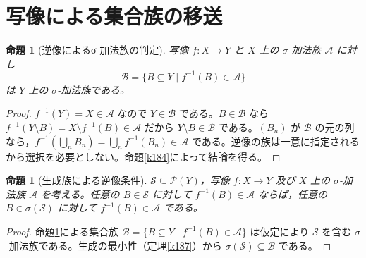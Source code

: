 \documentclass[a5paper,10pt,dvipdfmx]{jsarticle}
\theoremstyle{definition}
\theoremstyle{plain}
\newtheorem{prop}[ruledef]{命題}
\newcommand{\Pow}{\mathcal{P}}
\begin{document}
\section{写像による集合族の移送}
\begin{prop}[逆像によるσ-加法族の判定]\label{k191}
写像 $f\colon X\to Y$ と $X$ 上の $\sigma$-加法族 $\mathcal A$ に対し
\[\mathcal B=\{B\subseteq Y\mid f^{-1}(B)\in\mathcal A\}\]
は $Y$ 上の $\sigma$-加法族である。
\end{prop}
\begin{proof}
$f^{-1}(Y)=X\in\mathcal A$ なので $Y\in\mathcal B$ である。$B\in\mathcal B$ なら $f^{-1}(Y\setminus B)=X\setminus f^{-1}(B)\in\mathcal A$ だから $Y\setminus B\in\mathcal B$ である。$(B_n)$ が $\mathcal B$ の元の列なら，$f^{-1}(\bigcup_n B_n)=\bigcup_n f^{-1}(B_n)\in\mathcal A$ である。逆像の族は一意に指定されるから選択を必要としない。命題\ref{k184}によって結論を得る。
\end{proof}
\begin{prop}[生成族による逆像条件]\label{k192}
$\mathcal S\subseteq\Pow(Y)$，写像 $f\colon X\to Y$ 及び $X$ 上の $\sigma$-加法族 $\mathcal A$ を考える。任意の $B\in\mathcal S$ に対して $f^{-1}(B)\in\mathcal A$ ならば，任意の $B\in\sigma(\mathcal S)$ に対して $f^{-1}(B)\in\mathcal A$ である。
\end{prop}
\begin{proof}
命題\ref{k191}による集合族 $\mathcal B=\{B\subseteq Y\mid f^{-1}(B)\in\mathcal A\}$ は仮定により $\mathcal S$ を含む $\sigma$-加法族である。生成の最小性（定理\ref{k187}）から $\sigma(\mathcal S)\subseteq\mathcal B$ である。
\end{proof}
\end{document}
